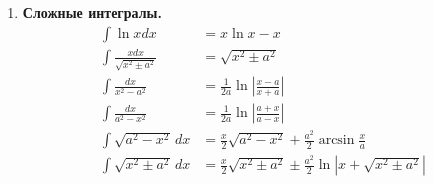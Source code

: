 \begin{enumerate}
    \item \textbf{Сложные интегралы.}
    {\small
    \begin{align*}
        \int \ln x dx &= x\ln x - x \\
        \int \frac{xdx}{\sqrt{x^2 \pm a^2}} &= \sqrt{x^2 \pm a^2} \\
        \int \frac{dx}{x^2-a^2} &= \frac{1}{2a}\ln\left|\frac{x-a}{x+a}\right| \\
        \int \frac{dx}{a^2-x^2} &= \frac{1}{2a}\ln\left|\frac{a+x}{a-x}\right| \\
        \int \sqrt{a^2-x^2}\, dx &= \frac{x}{2}\sqrt{a^2-x^2} + \frac{a^2}{2}\arcsin\frac{x}{a} \\
        \int \sqrt{x^2 \pm a^2}\, dx &= \frac{x}{2}\sqrt{x^2 \pm a^2} \pm \frac{a^2}{2}\ln|x + \sqrt{x^2 \pm a^2}| \\
    \end{align*}
    \vspace{-5mm}
    }


\end{enumerate}
